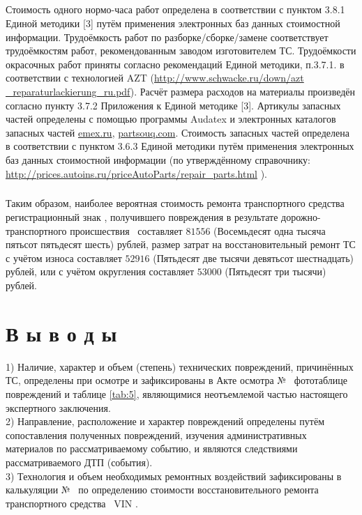 \subparagraph{}Стоимость одного нормо-часа работ определена в соответствии с пунктом 3.8.1 Единой методики [3] путём применения электронных баз данных стоимостной информации.
Трудоёмкость работ по разборке/сборке/замене  соответствует трудоёмкостям работ, рекомендованным заводом изготовителем ТС. Трудоёмкости окрасочных работ приняты согласно рекомендаций Единой методики, п.3.7.1. в соответствии с технологией  AZT (\url{http://www.schwacke.ru/down/azt _reparaturlackierung_ru.pdf}). Расчёт размера расходов на материалы произведён  согласно пункту 3.7.2 Приложения к Единой методике [3]. Артикулы запасных частей определены с помощью программы Audatex и электронных  каталогов запасных частей \url{emex.ru}, \url{partsouq.com}.
Стоимость запасных частей определена в соответствии с пунктом 3.6.3 Единой методики путём применения электронных баз данных стоимостной информации (по утверждённому справочнику: \url{http://prices.autoins.ru/priceAutoParts/repair_parts.html} ).
  
\subparagraph{}Таким образом,  наиболее вероятная стоимость ремонта транспортного средства \tc\, регистрационный знак , получившего повреждения в результате дорожно-транспортного происшествия  \, составляет $81 556$ (Восемьдесят одна тысяча пятьсот пятьдесят шесть) рублей,  размер затрат на восстановительный ремонт ТС с учётом износа составляет  $ 52 916 $ (Пятьдесят две тысячи девятьсот шестнадцать) рублей, или с учётом округления составляет $ 53 000 $ (Пятьдесят три тысячи) рублей.
      

\section{В ы в о д ы}

1) Наличие, характер и объем (степень) технических повреждений, причинённых ТС, определены при осмотре и зафиксированы в Акте осмотра № \NomerDoc\,  фототаблице повреждений и таблице \ref{tab:5}, являющимися неотъемлемой частью настоящего экспертного заключения.\\[3mm]
    
2) Направление, расположение и характер повреждений определены путём сопоставления полученных повреждений, изучения административных материалов по рассматриваемому событию, и  являются  следствиями рассматриваемого ДТП (события).\\[3mm]
    
3) Технология и объем необходимых ремонтных воздействий зафиксированы в калькуляции № \NomerDoc\, по определению стоимости восстановительного ремонта транспортного средства \tc\, VIN  \vin. \\[3mm]
    
